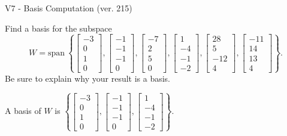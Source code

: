 \begin{exercise}
  \begin{exerciseTitle}V7 - Basis Computation (ver. 215)\end{exerciseTitle}
  \begin{exerciseStatement}
    Find a basis for the subspace 
\[W=\mathrm{span}\ \left\{\left[\begin{array}{r}
-3 \\
0 \\
1 \\
0
\end{array}\right] , \left[\begin{array}{r}
-1 \\
-1 \\
-1 \\
0
\end{array}\right] , \left[\begin{array}{r}
-7 \\
2 \\
5 \\
0
\end{array}\right] , \left[\begin{array}{r}
1 \\
-4 \\
-1 \\
-2
\end{array}\right] , \left[\begin{array}{r}
28 \\
5 \\
-12 \\
4
\end{array}\right] , \left[\begin{array}{r}
-11 \\
14 \\
13 \\
4
\end{array}\right]\right\}.\]
 Be sure to explain why your result is a basis.


  \end{exerciseStatement}
  \begin{exerciseAnswer}
   A basis of \(W\) is  \(\left\{\left[\begin{array}{r}
-3 \\
0 \\
1 \\
0
\end{array}\right] , \left[\begin{array}{r}
-1 \\
-1 \\
-1 \\
0
\end{array}\right] , \left[\begin{array}{r}
1 \\
-4 \\
-1 \\
-2
\end{array}\right]\right\}\).
  


  \end{exerciseAnswer}
\end{exercise}